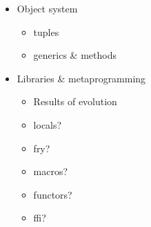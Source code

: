\begin{itemize}
\item Object system
      \begin{itemize}
        \item tuples
        \item generics \& methods
      \end{itemize}

\item Libraries \& metaprogramming
      \begin{itemize}
        \item Results of evolution
        \item locals?
        \item fry?
        \item macros?
        \item functors?
        \item ffi?
      \end{itemize}

\end{itemize}



